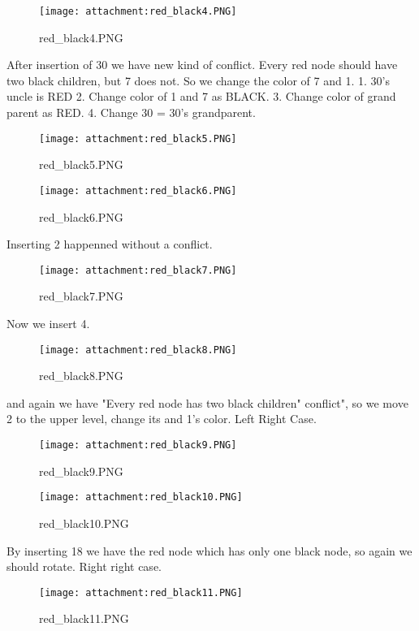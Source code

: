 \documentclass[11pt]{article}
\makeatletter
\def\maxwidth{\ifdim\Gin@nat@width>\linewidth\linewidth
    \else\Gin@nat@width\fi}
\let\Oldincludegraphics\includegraphics
\renewcommand{\includegraphics}[1]{\Oldincludegraphics[width=.8\maxwidth]{#1}}
\makeatother
\begin{document}
    \begin{figure}
\centering
\texttt{[image: attachment:red\_black4.PNG]}
\caption{red\_black4.PNG}
\end{figure}

    After insertion of 30 we have new kind of conflict. Every red node
should have two black children, but 7 does not. So we change the color
of 7 and 1. 1. 30's uncle is RED 2. Change color of 1 and 7 as BLACK. 3.
Change color of grand parent as RED. 4. Change 30 = 30's grandparent.

    \begin{figure}
\centering
\texttt{[image: attachment:red\_black5.PNG]}
\caption{red\_black5.PNG}
\end{figure}

    \begin{figure}
\centering
\texttt{[image: attachment:red\_black6.PNG]}
\caption{red\_black6.PNG}
\end{figure}

    Inserting 2 happenned without a conflict.

    \begin{figure}
\centering
\texttt{[image: attachment:red\_black7.PNG]}
\caption{red\_black7.PNG}
\end{figure}

    Now we insert 4.

    \begin{figure}
\centering
\texttt{[image: attachment:red\_black8.PNG]}
\caption{red\_black8.PNG}
\end{figure}

    and again we have "Every red node has two black children" conflict", so
we move 2 to the upper level, change its and 1's color. Left Right Case.

    \begin{figure}
\centering
\texttt{[image: attachment:red\_black9.PNG]}
\caption{red\_black9.PNG}
\end{figure}

    \begin{figure}
\centering
\texttt{[image: attachment:red\_black10.PNG]}
\caption{red\_black10.PNG}
\end{figure}

    By inserting 18 we have the red node which has only one black node, so
again we should rotate. Right right case.

    \begin{figure}
\centering
\texttt{[image: attachment:red\_black11.PNG]}
\caption{red\_black11.PNG}
\end{figure}
\end{document}
